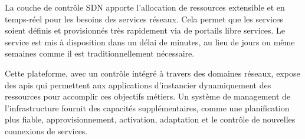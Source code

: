 

La couche de contrôle SDN apporte l'allocation de ressources extensible et en temps-réel pour les besoins des services réseaux. Cela permet que les services soient définis et provisionnés très rapidement via de portails libre services. Le service est mis à disposition dans un délai de minutes, au lieu de jours ou même semaines comme il est traditionnellement nécessaire.

Cette plateforme, avec un contrôle intégré à travers des domaines réseaux, expose des \glspl{api} qui permettent aux applications d'instancier dynamiquement des ressources pour accomplir ces objectifs métiers. Un  système de management de l'infrastructure fournit des capacités supplémentaires, comme une planification plus fiable, approvisionnement, activation, adaptation et le contrôle de nouvelles connexions de services.

